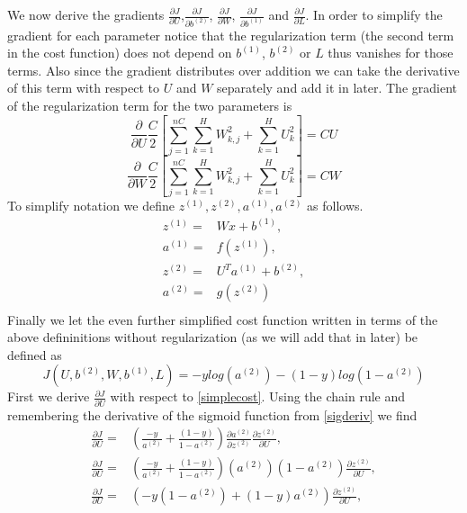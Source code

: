 \documentclass{article}
\begin{document}
We now derive the gradients \(\frac{\partial J}{\partial U}\),\(\frac{\partial J}{\partial b^{(2)}}\), \(\frac{\partial J}{\partial W}\), \(\frac{\partial J}{\partial b^{(1)}}\) and \(\frac{\partial J}{\partial L}\).  In order to simplify the gradient for each parameter notice that the regularization term (the second term in the cost function) does not depend on \(b^{(1)}\), \(b^{(2)}\) or \(L\) thus vanishes for those terms.  Also since the gradient distributes over addition we can take the derivative of this term with respect to \(U\) and \(W\) separately and add it in later.  The gradient of the regularization term for the two parameters is
\begin{equation}\label{ureg}
\frac{\partial}{\partial U}\frac{C}{2} \left[ \sum_{j=1}^{nC} \sum_{k=1}^H W_{k,j}^2 + \sum_{k=1}^H U_{k}^2\right] = CU
\end{equation}
\begin{equation}\label{wreg}
\frac{\partial}{\partial W}\frac{C}{2} \left[ \sum_{j=1}^{nC} \sum_{k=1}^H W_{k,j}^2 + \sum_{k=1}^H U_{k}^2\right] = CW
\end{equation}
To simplify notation we define \( z^{(1)}, z^{(2)}, a^{(1)}, a^{(2)} \) as follows.
\begin{equation}
\begin{aligned}
z^{(1)} =& Wx + b^{(1)}, \\
a^{(1)} =& f(z^{(1)}), \\
z^{(2)} =& U^T a^{(1)} + b^{(2)}, \\
a^{(2)} =& g(z^{(2)}) \\
\end{aligned}
\end{equation}
Finally we let the even further simplified cost function written in terms of the above defininitions without regularization (as we will add that in later) be defined as
\begin{equation}\label{simplecost}
J(U,b^{(2)},W,b^{(1)},L) = -ylog(a^{(2)})-(1-y)log(1-a^{(2)})
\end{equation}
First we derive \(\frac{\partial J}{\partial U}\) with respect to \eqref{simplecost}.  Using the chain rule and remembering the derivative of the sigmoid function from \eqref{sigderiv} we find
\begin{displaymath}
\begin{aligned}
\frac{\partial J}{\partial U} =&  \left(\frac{-y}{a^{(2)}}+\frac{(1-y)}{1-a^{(2)}}\right)\frac{\partial a^{(2)}}{\partial z^{(2)}} \frac{\partial z^{(2)}}{\partial U}, \\
\frac{\partial J}{\partial U} =& \left(\frac{-y}{a^{(2)}}+\frac{(1-y)}{1-a^{(2)}}\right)(a^{(2)})(1-a^{(2)}) \frac{\partial z^{(2)}}{\partial U}, \\
\frac{\partial J}{\partial U} =& \left(-y(1-a^{(2)})+(1-y)a^{(2)}\right)\frac{\partial z^{(2)}}{\partial U},
\end{aligned}
\end{displaymath}
\end{document}
